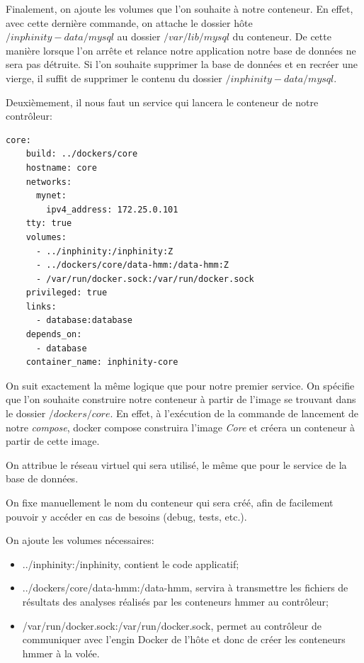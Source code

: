 Finalement, on ajoute les volumes que l'on souhaite à notre conteneur. En effet, avec cette dernière commande, on attache le dossier hôte \emph{$/inphinity-data/mysql$} au dossier \emph{$/var/lib/mysql$} du conteneur. De cette manière lorsque l'on arrête et relance notre application notre base de données ne sera pas détruite. Si l'on souhaite supprimer la base de données et en recréer une vierge, il suffit de supprimer le contenu du dossier \emph{$/inphinity-data/mysql$}.

Deuxièmement, il nous faut un service qui lancera le conteneur de notre contrôleur:

\begin{lstlisting}[frame=single]
core:
    build: ../dockers/core
    hostname: core
    networks:
      mynet:
        ipv4_address: 172.25.0.101
    tty: true
    volumes:
      - ../inphinity:/inphinity:Z
      - ../dockers/core/data-hmm:/data-hmm:Z
      - /var/run/docker.sock:/var/run/docker.sock
    privileged: true
    links:
      - database:database
    depends_on:
      - database
    container_name: inphinity-core
\end{lstlisting}

On suit exactement la même logique que pour notre premier service. On spécifie que l'on souhaite construire notre conteneur à partir de l'image se trouvant dans le dossier \emph{$/dockers/core$}. En effet, à l'exécution de la commande de lancement de notre \emph{compose}, docker compose construira l'image \emph{Core} et créera un conteneur à partir de cette image.

On attribue le réseau virtuel qui sera utilisé, le même que pour le service de la base de données.

On fixe manuellement le nom du conteneur qui sera créé, afin de facilement pouvoir y accéder en cas de besoins (debug, tests, etc.).

On ajoute les volumes nécessaires:

\begin{itemize}
\item ../inphinity:/inphinity, contient le code applicatif;
\item ../dockers/core/data-hmm:/data-hmm, servira à transmettre les fichiers de résultats des analyses réalisés par les conteneurs hmmer au contrôleur;
\item /var/run/docker.sock:/var/run/docker.sock, permet au contrôleur de communiquer avec l'engin Docker de l'hôte et donc de créer les conteneurs hmmer à la volée.
\end{itemize}


